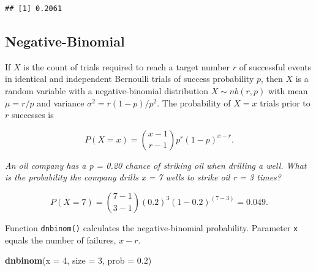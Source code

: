 \documentclass[
]{book}
\newenvironment{Shaded}{\begin{snugshade}}{\end{snugshade}}
\newcommand{\DataTypeTok}[1]{\textcolor[rgb]{0.13,0.29,0.53}{#1}}
\newcommand{\DecValTok}[1]{\textcolor[rgb]{0.00,0.00,0.81}{#1}}
\newcommand{\FloatTok}[1]{\textcolor[rgb]{0.00,0.00,0.81}{#1}}
\newcommand{\KeywordTok}[1]{\textcolor[rgb]{0.13,0.29,0.53}{\textbf{#1}}}
\newcommand{\NormalTok}[1]{#1}
\newcommand{\OperatorTok}[1]{\textcolor[rgb]{0.81,0.36,0.00}{\textbf{#1}}}
\newcommand{\StringTok}[1]{\textcolor[rgb]{0.31,0.60,0.02}{#1}}
\begin{document}
\begin{Shaded}
\end{Shaded}

\begin{verbatim}
## [1] 0.2061
\end{verbatim}

\hypertarget{negative-binomial}{%
\subsection{Negative-Binomial}\label{negative-binomial}}

If \(X\) is the count of trials required to reach a target number \(r\) of successful events in identical and independent Bernoulli trials of success probability \(p\), then \(X\) is a random variable with a negative-binomial distribution \(X \sim nb(r,p)\) with mean \(\mu=r/p\) and variance \(\sigma^2 = r(1-p)/p^2\). The probability of \(X=x\) trials prior to \(r\) successes is

\[P(X=x) = {{x - 1} \choose {r - 1}} p^r (1-p)^{x-r}.\]

\emph{An oil company has a p = 0.20 chance of striking oil when drilling a well. What is the probability the company drills x = 7 wells to strike oil r = 3 times?}

\[P(X=7) = {{7 - 1} \choose {3 - 1}} (0.2)^3 (1-0.2)^{(7-3)} = 0.049.\]

Function \texttt{dnbinom()} calculates the negative-binomial probability. Parameter \texttt{x} equals the number of failures, \(x - r\).

\begin{Shaded}
\begin{Highlighting}[]
\KeywordTok{dnbinom}\NormalTok{(}\DataTypeTok{x =} \DecValTok{4}\NormalTok{, }\DataTypeTok{size =} \DecValTok{3}\NormalTok{, }\DataTypeTok{prob =} \FloatTok{0.2}\NormalTok{)}
\end{Highlighting}
\end{Shaded}
\end{document}
